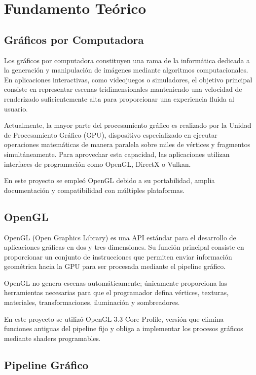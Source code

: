 \chapter{Fundamento Teórico}

\section{Gráficos por Computadora}

Los gráficos por computadora constituyen una rama de la informática dedicada a la generación y manipulación de imágenes mediante algoritmos computacionales. En aplicaciones interactivas, como videojuegos o simuladores, el objetivo principal consiste en representar escenas tridimensionales manteniendo una velocidad de renderizado suficientemente alta para proporcionar una experiencia fluida al usuario.

Actualmente, la mayor parte del procesamiento gráfico es realizado por la Unidad de Procesamiento Gráfico (GPU), dispositivo especializado en ejecutar operaciones matemáticas de manera paralela sobre miles de vértices y fragmentos simultáneamente. Para aprovechar esta capacidad, las aplicaciones utilizan interfaces de programación como OpenGL, DirectX o Vulkan.

En este proyecto se empleó OpenGL debido a su portabilidad, amplia documentación y compatibilidad con múltiples plataformas.

\section{OpenGL}

OpenGL (Open Graphics Library) es una API estándar para el desarrollo de aplicaciones gráficas en dos y tres dimensiones. Su función principal consiste en proporcionar un conjunto de instrucciones que permiten enviar información geométrica hacia la GPU para ser procesada mediante el pipeline gráfico.

OpenGL no genera escenas automáticamente; únicamente proporciona las herramientas necesarias para que el programador defina vértices, texturas, materiales, transformaciones, iluminación y sombreadores.

En este proyecto se utilizó OpenGL 3.3 Core Profile, versión que elimina funciones antiguas del pipeline fijo y obliga a implementar los procesos gráficos mediante shaders programables.

\section{Pipeline Gráfico}

